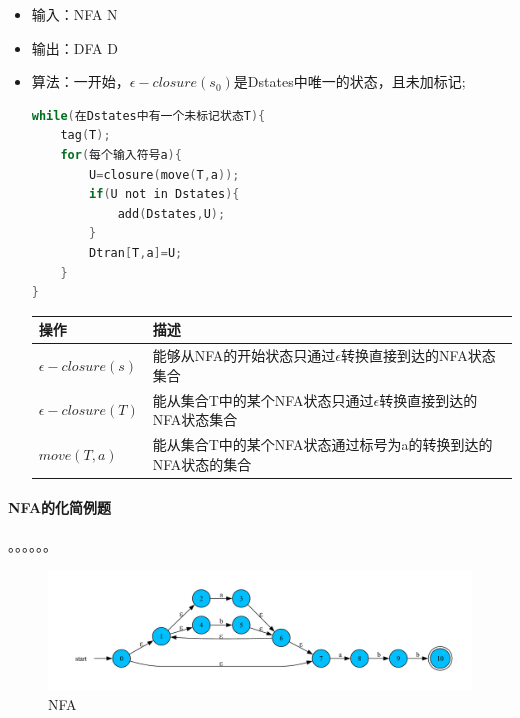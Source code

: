\documentclass[UTF8]{ctexart} %
\begin{document}
\begin{itemize}
    \item 输入：NFA N
    \item 输出：DFA D
    \item 算法：一开始，$\epsilon-closure(s_0)$是Dstates中唯一的状态，且未加标记;
          \begin{lstlisting}[language=c,style=c]
while(在Dstates中有一个未标记状态T){
    tag(T);
    for(每个输入符号a){
        U=closure(move(T,a));
        if(U not in Dstates){
            add(Dstates,U);
        }
        Dtran[T,a]=U;
    }
}
          \end{lstlisting}
          \begin{table}[H]
              \centering
              \begin{tabular}{|p{3cm}<{\centering}|p{8cm}<{\centering}|}
                  \hline
                  操作                    & 描述                                        \\
                  \hline
                  $\epsilon-closure(s)$ & 能够从NFA的开始状态只通过$\epsilon$转换直接到达的NFA状态集合    \\
                  \hline
                  $\epsilon-closure(T)$ & 能从集合T中的某个NFA状态只通过$\epsilon$转换直接到达的NFA状态集合 \\
                  \hline
                  $move(T,a)$           & 能从集合T中的某个NFA状态通过标号为a的转换到达的NFA状态的集合        \\
                  \hline
              \end{tabular}
          \end{table}
\end{itemize}

\paragraph{NFA的化简例题} 。。。。。。

\begin{figure}[H]
    \centering
    \includegraphics[width=\textwidth]{assets/nfa4.pdf}
    \caption{NFA}
\end{figure}
\end{document}
